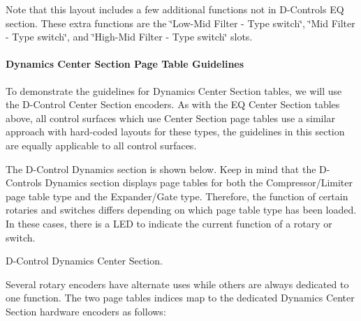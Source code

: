 Note that this layout includes a few additional functions not in D-\/\+Control\textquotesingle{}s E\+Q section. These extra functions are the \char`\"{}\+Low-\/\+Mid Filter -\/ Type switch\char`\"{}, \char`\"{}\+Mid Filter -\/ Type switch\char`\"{}, and \char`\"{}\+High-\/\+Mid Filter -\/ Type switch\char`\"{} slots.

\hypertarget{a00363_aax_page_table_guide_04_avid_center_section_page_tables_guidelines_dyn}{}\paragraph{Dynamics Center Section Page Table Guidelines}\label{a00363_aax_page_table_guide_04_avid_center_section_page_tables_guidelines_dyn}
 To demonstrate the guidelines for Dynamics Center Section tables, we will use the D-\/\+Control Center Section encoders. As with the E\+Q Center Section tables above, all control surfaces which use Center Section page tables use a similar approach with hard-\/coded layouts for these types, the guidelines in this section are equally applicable to all control surfaces.

The D-\/\+Control Dynamics section is shown below. Keep in mind that the D-\/\+Control\textquotesingle{}s Dynamics section displays page tables for both the Compressor/\+Limiter page table type and the Expander/\+Gate type. Therefore, the function of certain rotaries and switches differs depending on which page table type has been loaded. In these cases, there is a L\+E\+D to indicate the current function of a rotary or switch.

  D-\/\+Control Dynamics Center Section. 

Several rotary encoders have alternate uses while others are always dedicated to one function. The two page tables\textquotesingle{} indices map to the dedicated Dynamics Center Section hardware encoders as follows\+:


